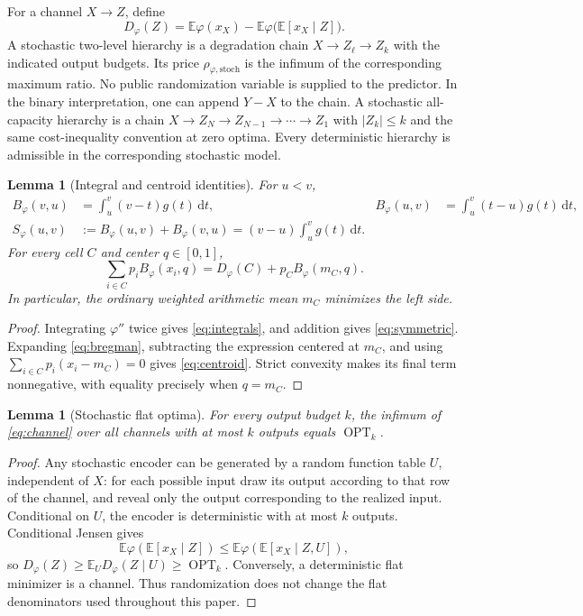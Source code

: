 \documentclass[11pt]{article}
\newtheorem{lemma}[theorem]{Lemma}
\theoremstyle{definition}\newtheorem{definition}[theorem]{Definition}
\theoremstyle{remark}\newtheorem{remark}[theorem]{Remark}
\newcommand{\ph}{\varphi}
\newcommand{\B}{B_{\ph}}
\newcommand{\D}{D_{\ph}}
\newcommand{\OPT}{\operatorname{OPT}}
\newcommand{\E}{\mathbb E}
\newcommand{\rd}{\,\mathrm d}
\newcommand{\stp}{\mathrm{stoch}}
\begin{document}
For a channel $X\to Z$, define
\begin{equation}
\D(Z)=\E\ph(x_X)-\E\ph\bigl(\E[x_X\mid Z]\bigr).
\label{eq:channel}
\end{equation}
A stochastic two-level hierarchy is a degradation chain $X\to Z_\ell\to Z_k$ with the indicated output budgets. Its price $\rho_{\ph,\stp}$ is the infimum of the corresponding maximum ratio. No public randomization variable is supplied to the predictor. In the binary interpretation, one can append $Y-X$ to the chain. A stochastic all-capacity hierarchy is a chain $X\to Z_N\to Z_{N-1}\to\cdots\to Z_1$ with $|Z_k|\le k$ and the same cost-inequality convention at zero optima. Every deterministic hierarchy is admissible in the corresponding stochastic model.

\begin{lemma}[Integral and centroid identities]
\label{lem:identities}
For $u<v$,
\begin{align}
\B(v,u)&=\int_u^v(v-t)g(t)\rd t,&
\B(u,v)&=\int_u^v(t-u)g(t)\rd t,\label{eq:integrals}\\
S_\ph(u,v)&:=\B(u,v)+\B(v,u)=(v-u)\int_u^v g(t)\rd t.\label{eq:symmetric}
\end{align}
For every cell $C$ and center $q\in[0,1]$,
\begin{equation}
\sum_{i\in C}p_i\B(x_i,q)=\D(C)+p_C\B(m_C,q).
\label{eq:centroid}
\end{equation}
In particular, the ordinary weighted arithmetic mean $m_C$ minimizes the left side.
\end{lemma}
\begin{proof}
Integrating $\ph''$ twice gives \eqref{eq:integrals}, and addition gives \eqref{eq:symmetric}. Expanding \eqref{eq:bregman}, subtracting the expression centered at $m_C$, and using $\sum_{i\in C}p_i(x_i-m_C)=0$ gives \eqref{eq:centroid}. Strict convexity makes its final term nonnegative, with equality precisely when $q=m_C$.
\end{proof}

\begin{lemma}[Stochastic flat optima]
\label{lem:flat}
For every output budget $k$, the infimum of \eqref{eq:channel} over all channels with at most $k$ outputs equals $\OPT_k$.
\end{lemma}
\begin{proof}
Any stochastic encoder can be generated by a random function table $U$, independent of $X$: for each possible input draw its output according to that row of the channel, and reveal only the output corresponding to the realized input. Conditional on $U$, the encoder is deterministic with at most $k$ outputs. Conditional Jensen gives
\[
\E\ph(\E[x_X\mid Z])\le \E\ph(\E[x_X\mid Z,U]),
\]
so $\D(Z)\ge\E_U\D(Z\mid U)\ge\OPT_k$. Conversely, a deterministic flat minimizer is a channel. Thus randomization does not change the flat denominators used throughout this paper.
\end{proof}
\end{document}

